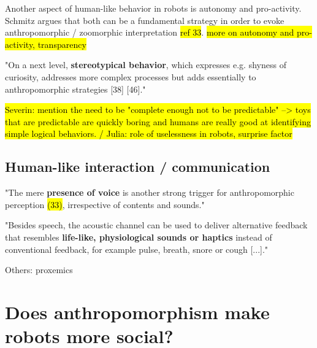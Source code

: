 \documentclass[lettersize, apacite, twoside, HRI]{apa_HRI}
\begin{document}
	Another aspect of human-like behavior in robots is autonomy and pro-activity. Schmitz argues that both can be a fundamental strategy in order to evoke anthropomorphic / zoomorphic interpretation \cite{schmitz_concepts_2011} \hl{ref 33}. \hl{more on autonomy and pro-activity, transparency}

	"On a next level, \textbf{stereotypical behavior}, which expresses e.g. shyness of curiosity, addresses more complex processes but adds essentially to anthropomorphic strategies [38] [46]." \cite{schmitz_concepts_2011}
	
	\hl{Severin: mention the need to be "complete enough not to be predictable" --> toys that are predictable are quickly boring and humans are really good at identifying simple logical behaviors. / Julia: role of uselessness in robots, surprise factor}


\subsection{Human-like interaction / communication}
\label{sec:4.3}


	"The mere \textbf{presence of voice} is another strong trigger for anthropomorphic perception \hl{(33)}, irrespective of contents and sounds." \cite{schmitz_concepts_2011}

	"Besides speech, the acoustic channel can be used to deliver alternative feedback that resembles \textbf{life-like, physiological sounds or haptics} instead of conventional feedback, for example pulse, breath, snore or cough [...]." \cite{schmitz_concepts_2011}


Others: proxemics


%
%
%
%
%
%


\section{Does anthropomorphism make robots more social?}
\label{sec:5}
\end{document}
